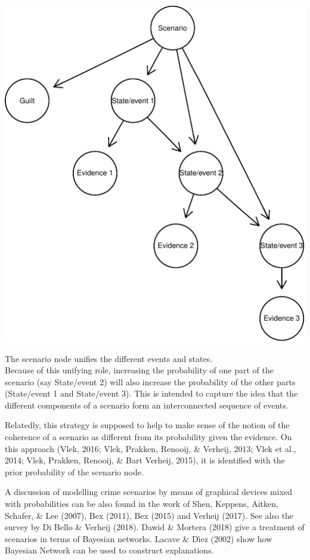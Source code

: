 \documentclass[11pt,dvipsnames,enabledeprecatedfontcommands]{scrartcl}
\begin{document}
\begin{center}\includegraphics{BNfiles/unnamed-chunk-13-1} \end{center}

\noindent The scenario node unifies the different events and states.\\
Because of this unifying role, increasing the probability of one part of
the scenario (say \textsf{State/event 2}) will also increase the
probability of the other parts (\textsf{State/event 1} and
\textsf{State/event 3}). This is intended to capture the idea that the
different components of a scenario form an interconnected sequence of
events.

Relatedly, this strategy is supposed to help to make sense of the notion
of the coherence of a scenario as different from its probability given
the evidence. On this approach (Vlek, 2016; Vlek, Prakken, Renooij, \&
Verheij, 2013; Vlek et al., 2014; Vlek, Prakken, Renooij, \& Bart
Verheij, 2015), it is identified with the prior probability of the
scenario node.


A discussion of modelling crime scenarios by means of graphical devices
mixed with probabilities can be also found in the work of Shen, Keppens,
Aitken, Schafer, \& Lee (2007), Bex (2011), Bex (2015) and Verheij
(2017). See also the survey by Di Bello \& Verheij (2018). Dawid \&
Mortera (2018) give a treatment of scenarios in terms of Bayesian
networks. Lacave \& Dı́ez (2002) show how Bayesian Network can be used to
construct explanations.
\end{document}
